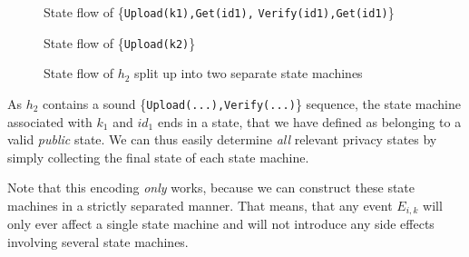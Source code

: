 \begin{figure}[H]
    \begin{minipage}[t]{0.5\textwidth}
        \centering
        \caption*{State flow of \{\texttt{Upload(k1),Get(id1),} \texttt{Verify(id1),Get(id1)}\}}
    \end{minipage}
    \begin{minipage}[t]{0.5\textwidth}
        \centering
        \caption*{State flow of \{\texttt{Upload(k2)}\}}
    \end{minipage}
    \caption{State flow of $h_{2}$ split up into two separate state machines }
\end{figure}

As \(h_2\) contains a sound \{\texttt{Upload(...),Verify(...)}\} sequence, the state machine associated with \(k_1\) and \(id_1\) ends in a state, that we have defined as belonging to a valid \emph{public} state. 
We can thus easily determine \emph{all} relevant privacy states by simply collecting the final state of each state machine.

Note that this encoding \emph{only} works, because we can construct these state machines in a strictly separated manner. That means, that any event \(E_{i,k}\) will only ever affect a single state machine and will not introduce any side effects involving several state machines.

